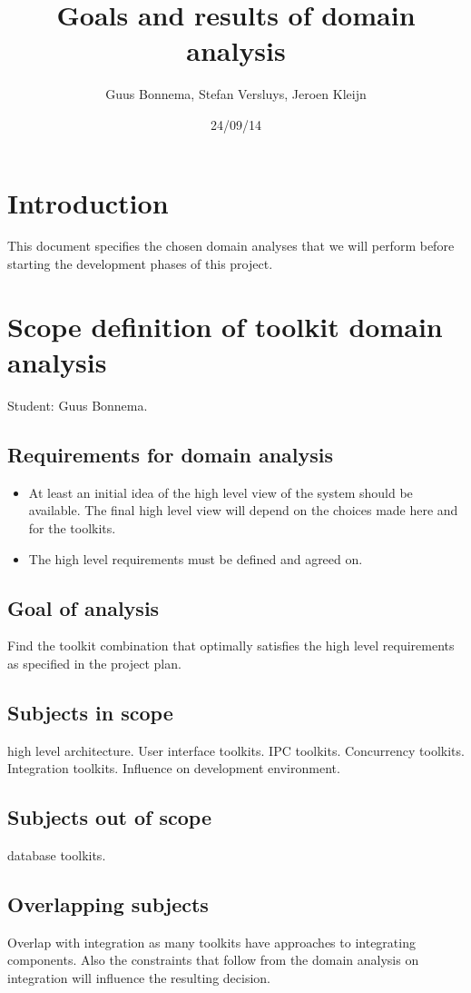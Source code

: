 \documentclass[a4paper,11pt]{article}
\author{Guus Bonnema, Stefan Versluys, Jeroen Kleijn}
\date{24/09/14}
\title{Goals and results of domain analysis}
\begin{document}

\newcommand{\xmas}{x\textsc{mas}}%

\maketitle

\section{Introduction}
This document specifies the chosen domain analyses that we will perform before starting the development phases
of this project.

\section{Scope definition of toolkit domain analysis}
Student: Guus Bonnema.
\subsection{Requirements for domain analysis}
\begin{itemize}
    \item At least an initial idea of the high level view of the system should be available. The final high level
	    view will depend on the choices made here and for the toolkits.
    \item The high level requirements must be defined and agreed on.
\end{itemize}
\subsection{Goal of analysis}
Find the toolkit combination that optimally satisfies the high level requirements as specified in the project plan.
\subsection{Subjects in scope}
high level architecture. User interface toolkits. IPC toolkits. Concurrency toolkits. Integration toolkits.
Influence on development environment.
\subsection{Subjects out of scope}
database toolkits.
\subsection{Overlapping subjects}
Overlap with integration as many toolkits have approaches to integrating components. Also the constraints that follow
from the domain analysis on integration will influence the resulting decision.
\end{document}
